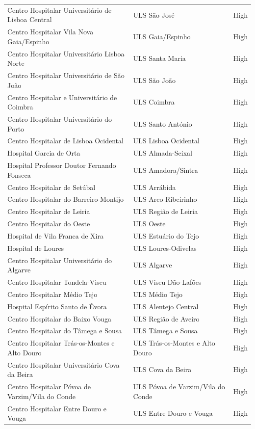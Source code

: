 \begin{longtable}{p{6cm}p{6cm}p{2cm}}
Centro Hospitalar Universitário de Lisboa Central & ULS São José & High \\
Centro Hospitalar Vila Nova Gaia/Espinho & ULS Gaia/Espinho & High \\
Centro Hospitalar Universitário Lisboa Norte & ULS Santa Maria & High \\
Centro Hospitalar Universitário de São João & ULS São João & High \\
Centro Hospitalar e Universitário de Coimbra & ULS Coimbra & High \\
Centro Hospitalar Universitário do Porto & ULS Santo António & High \\
Centro Hospitalar de Lisboa Ocidental & ULS Lisboa Ocidental & High \\
Hospital Garcia de Orta & ULS Almada-Seixal & High \\
Hospital Professor Doutor Fernando Fonseca & ULS Amadora/Sintra & High \\
Centro Hospitalar de Setúbal & ULS Arrábida & High \\
Centro Hospitalar do Barreiro-Montijo & ULS Arco Ribeirinho & High \\
Centro Hospitalar de Leiria & ULS Região de Leiria & High \\
Centro Hospitalar do Oeste & ULS Oeste & High \\
Hospital de Vila Franca de Xira & ULS Estuário do Tejo & High \\
Hospital de Loures & ULS Loures-Odivelas & High \\
Centro Hospitalar Universitário do Algarve & ULS Algarve & High \\
Centro Hospitalar Tondela-Viseu & ULS Viseu Dão-Lafões & High \\
Centro Hospitalar Médio Tejo & ULS Médio Tejo & High \\
Hospital Espírito Santo de Évora & ULS Alentejo Central & High \\
Centro Hospitalar do Baixo Vouga & ULS Região de Aveiro & High \\
Centro Hospitalar do Tâmega e Sousa & ULS Tâmega e Sousa & High \\
Centro Hospitalar Trás-os-Montes e Alto Douro & ULS Trás-os-Montes e Alto Douro & High \\
Centro Hospitalar Universitário Cova da Beira & ULS Cova da Beira & High \\
Centro Hospitalar Póvoa de Varzim/Vila do Conde & ULS Póvoa de Varzim/Vila do Conde & High \\
Centro Hospitalar Entre Douro e Vouga & ULS Entre Douro e Vouga & High \\

\end{longtable}
